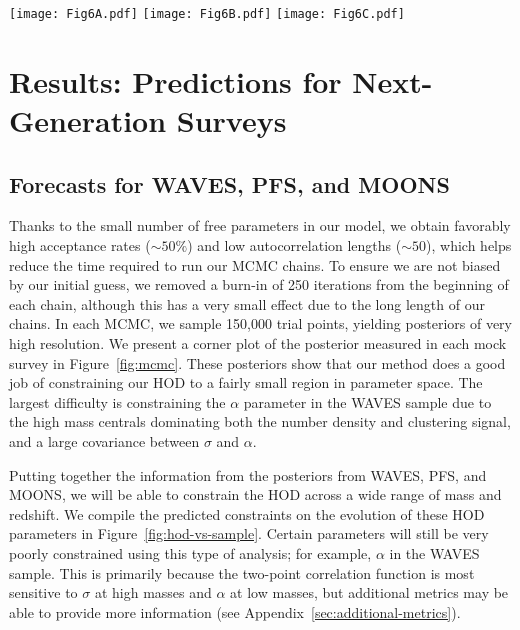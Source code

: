 \documentclass[twocolumn,twocolappendix]{aastex63}
\begin{document}
\begin{figure*}[ht!]
    \texttt{[image: Fig6A.pdf]}
    \texttt{[image: Fig6B.pdf]}
    \texttt{[image: Fig6C.pdf]}
    \caption{HOD posterior probability distribution measured in WAVES (left), PFS (center), and MOONS (right). Measured by MCMC sampling of our two-parameter conservative HOD model at the effective redshift of each sample, and comparing the predicted $w_{\rm p}(r_{\rm p})$ to 600 mock realizations. For each sample, the UniverseMachine truth value is marked with a blue circle and best-fit parameters are marked with an orange X. \label{fig:mcmc}}
\end{figure*}



\section{Results: Predictions for Next-Generation Surveys}
\label{sec:analysis}

\subsection{Forecasts for WAVES, PFS, and MOONS}
\label{sec:forecasts}

Thanks to the small number of free parameters in our model, we obtain favorably high acceptance rates ($\sim 50\%$) and low autocorrelation lengths ($\sim 50$), which helps reduce the time required to run our MCMC chains.
To ensure we are not biased by our initial guess, we removed a burn-in of 250 iterations from the beginning of each chain, although this has a very small effect due to the long length of our chains.
In each MCMC, we sample 150,{}000 trial points, yielding posteriors of very high resolution. We present a corner plot of the posterior measured in each mock survey in Figure~\ref{fig:mcmc}. These posteriors show that our method does a good job of constraining our HOD to a fairly small region in parameter space. The largest difficulty is constraining the $\alpha$ parameter in the WAVES sample due to the high mass centrals dominating both the number density and clustering signal, and a large covariance between $\sigma$ and $\alpha$.

Putting together the information from the posteriors from WAVES, PFS, and MOONS, we will be able to constrain the HOD across a wide range of mass and redshift. We compile the predicted constraints on the evolution of these HOD parameters in Figure~\ref{fig:hod-vs-sample}. Certain parameters will still be very poorly constrained using this type of analysis; for example, $\alpha$ in the WAVES sample. This is primarily because the two-point correlation function is most sensitive to $\sigma$ at high masses and $\alpha$ at low masses, but additional metrics may be able to provide more information (see Appendix~\ref{sec:additional-metrics}).
\end{document}
